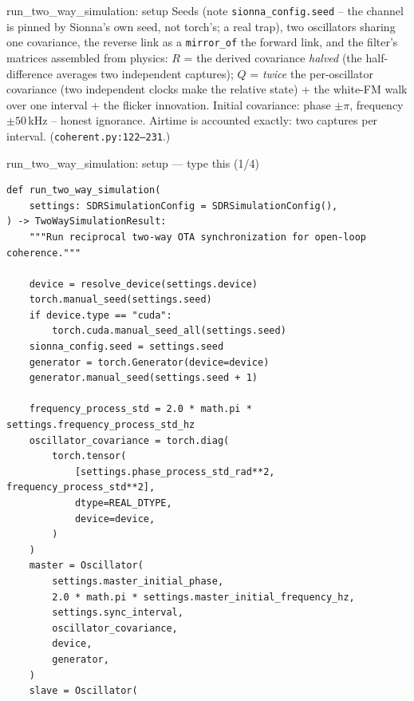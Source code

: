 \documentclass[10pt]{beamer}
\begin{document}
\begin{frame}{run\_two\_way\_simulation: setup}
  Seeds (note \texttt{sionna\_config.seed} -- the channel is
  pinned by Sionna's own seed, not torch's; a real trap), two
  oscillators sharing one covariance, the reverse link as a
  \texttt{mirror\_of} the forward link, and the filter's
  matrices assembled from physics: $R$ = the derived
  covariance \emph{halved} (the half-difference averages two
  independent captures); $Q$ = \emph{twice} the per-oscillator
  covariance (two independent clocks make the relative state)
  + the white-FM walk over one interval + the flicker
  innovation. Initial covariance: phase $\pm\pi$, frequency
  $\pm50$\,kHz -- honest ignorance. Airtime is accounted
  exactly: two captures per interval.
  (\texttt{coherent.py:122--231}.)
\end{frame}

\begin{frame}[fragile]{run\_two\_way\_simulation: setup --- type this (1/4)}
\begin{lstlisting}[basicstyle=\ttfamily\tiny]
def run_two_way_simulation(
    settings: SDRSimulationConfig = SDRSimulationConfig(),
) -> TwoWaySimulationResult:
    """Run reciprocal two-way OTA synchronization for open-loop coherence."""

    device = resolve_device(settings.device)
    torch.manual_seed(settings.seed)
    if device.type == "cuda":
        torch.cuda.manual_seed_all(settings.seed)
    sionna_config.seed = settings.seed
    generator = torch.Generator(device=device)
    generator.manual_seed(settings.seed + 1)

    frequency_process_std = 2.0 * math.pi * settings.frequency_process_std_hz
    oscillator_covariance = torch.diag(
        torch.tensor(
            [settings.phase_process_std_rad**2, frequency_process_std**2],
            dtype=REAL_DTYPE,
            device=device,
        )
    )
    master = Oscillator(
        settings.master_initial_phase,
        2.0 * math.pi * settings.master_initial_frequency_hz,
        settings.sync_interval,
        oscillator_covariance,
        device,
        generator,
    )
    slave = Oscillator(
\end{lstlisting}
\end{frame}
\end{document}

